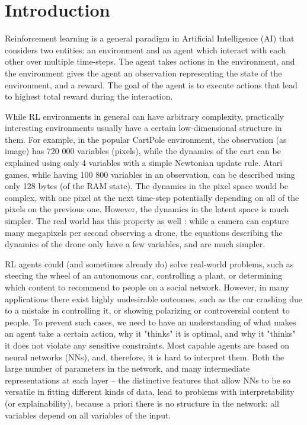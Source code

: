 \documentclass[a4paper,11pt,oneside]{report}
\begin{document}
\maketoc

\chapter{Introduction}
\label{ch:intro}

Reinforcement learning is a general paradigm in Artificial Intelligence (AI) that considers two entities: an environment and an agent which interact with each other over multiple time-steps. The agent takes actions in the environment, and the environment gives the agent an observation representing the state of the environment, and a reward. The goal of the agent is to execute actions that lead to highest total reward during the interaction.

While RL environments in general can have arbitrary complexity, practically interesting environments usually have a certain low-dimensional structure in them. For example, in the popular CartPole environment, the observation (as image) has 720 000 variables (pixels), while the dynamics of the cart can be explained using only 4 variables with a simple Newtonian update rule. Atari games, while having 100 800 variables in an observation, can be described using only 128 bytes (of the RAM state). The dynamics in the pixel space would be complex, with one pixel at the next time-step potentially depending on all of the pixels on the previous one. However, the dynamics in the latent space is much simpler. The real world has this property as well \cite{Hamming1980}: while a camera can capture many megapixels per second observing a drone, the equations describing the dynamics of the drone only have a few variables, and are much simpler.


RL agents could (and sometimes already do) solve real-world problems, such as steering the wheel of an autonomous car, controlling a plant, or determining which content to recommend to people on a social network. However, in many applications there exist highly undesirable outcomes, such as the car crashing due to a mistake in controlling it, or showing polarizing or controversial content to people. To prevent such cases, we need to have an understanding of what makes an agent take a certain action, why it "thinks" it is optimal, and why it "thinks" it does not violate any sensitive constraints. Most capable agents are based on neural networks (NNs), and, therefore, it is hard to interpret them. Both the large number of parameters in the network, and many intermediate representations at each layer -- the distinctive features that allow NNs to be so versatile in fitting different kinds of data, lead to problems with interpretability (or explainability), because a priori there is no structure in the network: all variables depend on all variables of the input.
\end{document}
